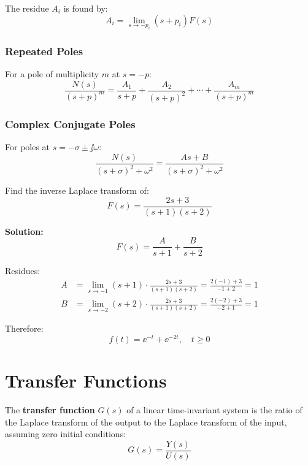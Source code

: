 The residue $A_i$ is found by:
\begin{equation}
A_i = \lim_{s \to -p_i} (s + p_i) F(s)
\end{equation}

\subsubsection{Repeated Poles}
For a pole of multiplicity $m$ at $s = -p$:
\begin{equation}
\frac{N(s)}{(s+p)^m} = \frac{A_1}{s+p} + \frac{A_2}{(s+p)^2} + \cdots + \frac{A_m}{(s+p)^m}
\end{equation}

\subsubsection{Complex Conjugate Poles}
For poles at $s = -\sigma \pm \jj\omega$:
\begin{equation}
\frac{N(s)}{(s+\sigma)^2+\omega^2} = \frac{As + B}{(s+\sigma)^2+\omega^2}
\end{equation}

\begin{examplebox}[title=Example 0.3: Partial Fraction Expansion]
Find the inverse Laplace transform of:
\begin{equation}
F(s) = \frac{2s + 3}{(s+1)(s+2)}
\end{equation}

\textbf{Solution:}
\begin{equation}
F(s) = \frac{A}{s+1} + \frac{B}{s+2}
\end{equation}

Residues:
\begin{align}
A &= \lim_{s \to -1} (s+1) \cdot \frac{2s+3}{(s+1)(s+2)} = \frac{2(-1)+3}{-1+2} = 1 \\
B &= \lim_{s \to -2} (s+2) \cdot \frac{2s+3}{(s+1)(s+2)} = \frac{2(-2)+3}{-2+1} = 1
\end{align}

Therefore:
\begin{equation}
f(t) = \ee^{-t} + \ee^{-2t}, \quad t \geq 0
\end{equation}
\end{examplebox}

\section{Transfer Functions}

\begin{definitionbox}[title=Definition 0.3: Transfer Function]
The \textbf{transfer function} $G(s)$ of a linear time-invariant system is the ratio of the Laplace transform of the output to the Laplace transform of the input, assuming zero initial conditions:
\begin{equation}
G(s) = \frac{Y(s)}{U(s)}
\end{equation}
\end{definitionbox}

